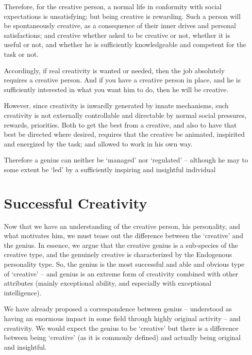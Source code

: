\documentclass[
]{book}
\begin{document}
Therefore, for the creative person, a normal life in conformity with social expectations is unsatisfying; but being creative is rewarding. Such a person will be spontaneously creative, as a consequence of their inner drives and personal satisfactions; and creative whether asked to be creative or not, whether it is useful or not, and whether he is sufficiently knowledgeable and competent for the task or not.

Accordingly, if real creativity is wanted or needed, then the job absolutely requires a creative person. And if you have a creative person in place, and he is sufficiently interested in what you want him to do, then he will be creative.

However, since creativity is inwardly generated by innate mechanisms, such creativity is not externally controllable and directable by normal social pressures, rewards, priorities. Both to get the best from a creative, and also to have that best be directed where desired, requires that the creative be animated, inspirited and energized by the task; and allowed to work in his own way.

Therefore a genius can neither be `managed' nor `regulated' -- although he may to some extent be `led' by a sufficiently inspiring and insightful individual

\hypertarget{successful-creativity}{%
\chapter{Successful Creativity}\label{successful-creativity}}

Now that we have an understanding of the creative person, his personality, and what motivates him, we must tease out the difference between the `creative' and the genius. In essence, we argue that the creative genius is a sub-species of the creative type, and the genuinely creative is characterized by the Endogenous personality type. So, the genius is the most successful and able and obvious type of `creative' -- and genius is an extreme form of creativity combined with other attributes (mainly exceptional ability, and especially with exceptional intelligence).

We have already proposed a correspondence between genius -- understood as having an enormous impact in some field through highly original activity -- and creativity. We would expect the genius to be `creative' but there is a difference between being `creative' (as it is commonly defined) and actually being original and insightful.
\end{document}
